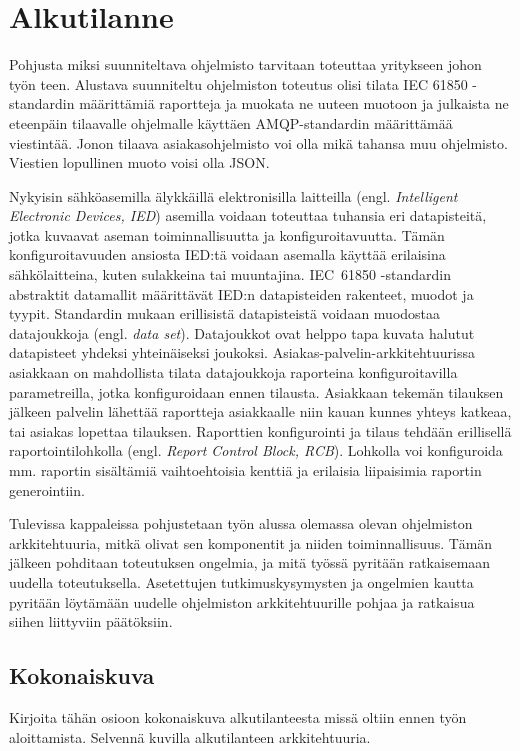 \chapter{Alkutilanne}
\label{ch:alkutilanne}

\begin{it}
	Pohjusta miksi suunniteltava ohjelmisto tarvitaan toteuttaa yritykseen johon työn teen. Alustava suunniteltu ohjelmiston toteutus olisi tilata IEC 61850 -standardin määrittämiä raportteja ja muokata ne uuteen muotoon ja julkaista ne eteenpäin tilaavalle ohjelmalle käyttäen AMQP-standardin määrittämää viestintää. Jonon tilaava asiakasohjelmisto voi olla mikä tahansa muu ohjelmisto. Viestien lopullinen muoto voisi olla JSON.
\end{it}

Nykyisin sähköasemilla älykkäillä elektronisilla laitteilla (engl. \emph{Intelligent Electronic Devices, IED}) asemilla voidaan toteuttaa tuhansia eri datapisteitä, jotka kuvaavat aseman toiminnallisuutta ja konfiguroitavuutta. Tämän konfiguroitavuuden ansiosta IED:tä voidaan asemalla käyttää erilaisina sähkölaitteina, kuten sulakkeina tai muuntajina. IEC~61850 -standardin abstraktit datamallit määrittävät IED:n datapisteiden rakenteet, muodot ja tyypit. Standardin mukaan erillisistä datapisteistä voidaan muodostaa datajoukkoja (engl. \emph{data set}). Datajoukkot ovat helppo tapa kuvata halutut datapisteet yhdeksi yhteinäiseksi joukoksi. Asiakas-palvelin-arkkitehtuurissa asiakkaan on mahdollista tilata datajoukkoja raporteina konfiguroitavilla parametreilla, jotka konfiguroidaan ennen tilausta. Asiakkaan tekemän tilauksen jälkeen palvelin lähettää raportteja asiakkaalle niin kauan kunnes yhteys katkeaa, tai asiakas lopettaa tilauksen. Raporttien konfigurointi ja tilaus tehdään erillisellä raportointilohkolla (engl. \emph{Report Control Block, RCB}). Lohkolla voi konfiguroida mm. raportin sisältämiä vaihtoehtoisia kenttiä ja erilaisia liipaisimia raportin generointiin.

Tulevissa kappaleissa pohjustetaan työn alussa olemassa olevan ohjelmiston arkkitehtuuria, mitkä olivat sen komponentit ja niiden toiminnallisuus. Tämän jälkeen pohditaan toteutuksen ongelmia, ja mitä työssä pyritään ratkaisemaan uudella toteutuksella. Asetettujen tutkimuskysymysten ja ongelmien kautta pyritään löytämään uudelle ohjelmiston arkkitehtuurille pohjaa ja ratkaisua siihen liittyviin päätöksiin.

\section{Kokonaiskuva}
\begin{it}
	Kirjoita tähän osioon kokonaiskuva alkutilanteesta missä oltiin ennen työn aloittamista. Selvennä kuvilla alkutilanteen arkkitehtuuria.
\end{it}

